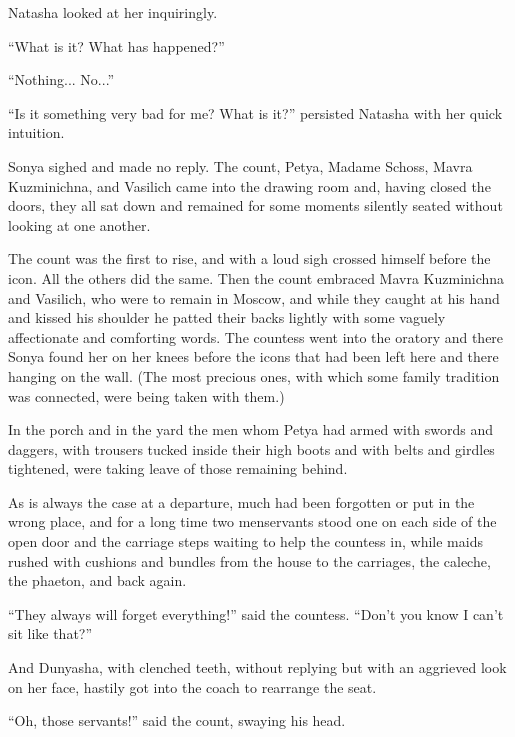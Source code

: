 Natasha looked at her inquiringly.

``What is it? What has happened?''

``Nothing... No...''

``Is it something very bad for me? What is it?'' persisted
Natasha with her quick intuition.

Sonya sighed and made no reply. The count, Petya, Madame Schoss,
Mavra Kuzminichna, and Vasilich came into the drawing room and,
having closed the doors, they all sat down and remained for some
moments silently seated without looking at one another.

The count was the first to rise, and with a loud sigh crossed
himself before the icon. All the others did the same. Then the
count embraced Mavra Kuzminichna and Vasilich, who were to remain
in Moscow, and while they caught at his hand and kissed his
shoulder he patted their backs lightly with some vaguely
affectionate and comforting words. The countess went into the
oratory and there Sonya found her on her knees before the icons
that had been left here and there hanging on the wall.  (The most
precious ones, with which some family tradition was connected,
were being taken with them.)

In the porch and in the yard the men whom Petya had armed with
swords and daggers, with trousers tucked inside their high boots
and with belts and girdles tightened, were taking leave of those
remaining behind.

As is always the case at a departure, much had been forgotten or
put in the wrong place, and for a long time two menservants stood
one on each side of the open door and the carriage steps waiting
to help the countess in, while maids rushed with cushions and
bundles from the house to the carriages, the caleche, the
phaeton, and back again.

``They always will forget everything!'' said the
countess. ``Don't you know I can't sit like that?''

And Dunyasha, with clenched teeth, without replying but with an
aggrieved look on her face, hastily got into the coach to
rearrange the seat.

``Oh, those servants!'' said the count, swaying his head.


